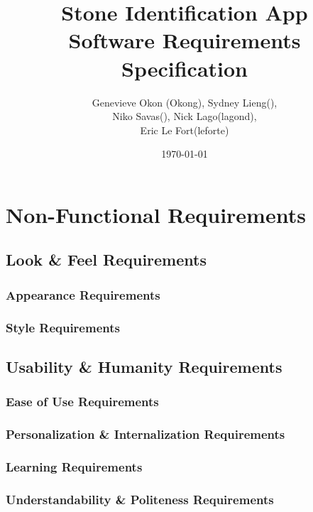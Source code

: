 \documentclass[titlepage]{article}
\begin{document}
\title{Stone Identification App \\
	Software Requirements Specification}
\author{Genevieve Okon (Okong), Sydney Lieng(),\\
	Niko Savas(), Nick Lago(lagond),\\
	Eric Le Fort(leforte)}
\date{\today}
\maketitle


\section{Non-Functional Requirements}
\subsection{Look \& Feel Requirements}
\subsubsection{Appearance Requirements}
\subsubsection{Style Requirements}

\subsection{Usability \& Humanity Requirements}
\subsubsection{Ease of Use Requirements}
\subsubsection{Personalization \& Internalization Requirements}
\subsubsection{Learning Requirements}
\subsubsection{Understandability \& Politeness Requirements}
\end{document}
